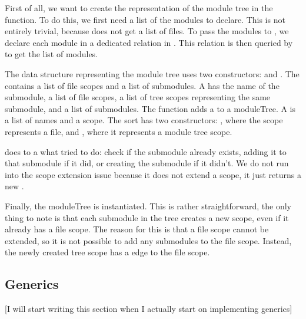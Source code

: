 First of all, we want to create the representation of the module tree in the  function.
To do this, we first need a list of the modules to declare.
This is not entirely trivial, because  does not get a list of files.
To pass the modules to , we declare each module in a dedicated relation  in .
This relation is then queried by  to get the list of modules.

The data structure representing the module tree uses two constructors:  and .
The  contains a list of file scopes and a list of submodules.
A  has the name of the submodule, a list of file scopes, a list of tree scopes representing the same submodule, and a list of submodules.
The function  adds a  to a moduleTree.
A  is a list of names and a scope.
The sort  has two constructors: , where the scope represents a file, and , where it represents a module tree scope.

 does to a  what  tried to do: check if the submodule already exists, adding it to that submodule if it did, or creating the submodule if it didn't.
We do not run into the scope extension issue because it does not extend a scope, it just returns a new .

Finally, the moduleTree is instantiated.
This is rather straightforward, the only thing to note is that each submodule in the tree creates a new scope, even if it already has a file scope.
The reason for this is that a file scope cannot be extended, so it is not possible to add any submodules to the file scope.
Instead, the newly created tree scope has a  edge to the file scope.




\subsection{\label{subsec:solution__statix__generics}Generics}
[I will start writing this section when I actually start on implementing generics]
